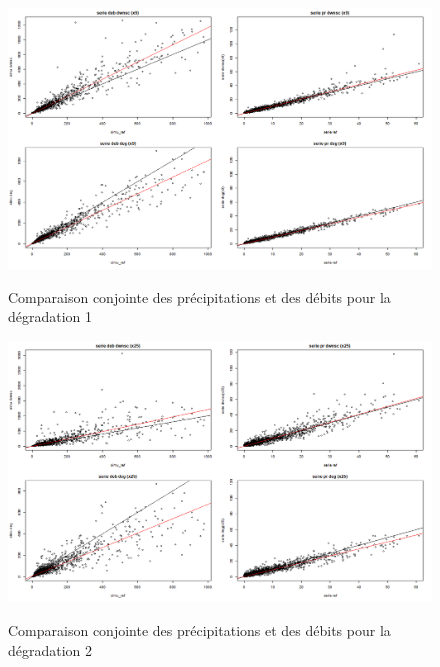 \documentclass[a4paper,11pt]{article}
\numberwithin{equation}{section}
\begin{document}
\begin{figure}[H]
	\begin{center}
		\includegraphics[scale=0.35]{images/multi_comparaison_2.png}\\
	\end{center}
\caption{Comparaison conjointe des précipitations et des débits pour la dégradation 1}
\end{figure}
\begin{figure}[H]
	\begin{center}
		\includegraphics[scale=0.35]{images/multi_comparaison_3.png}\\
	\end{center}
\caption{Comparaison conjointe des précipitations et des débits pour la dégradation 2}
\end{figure} 
\end{document}
